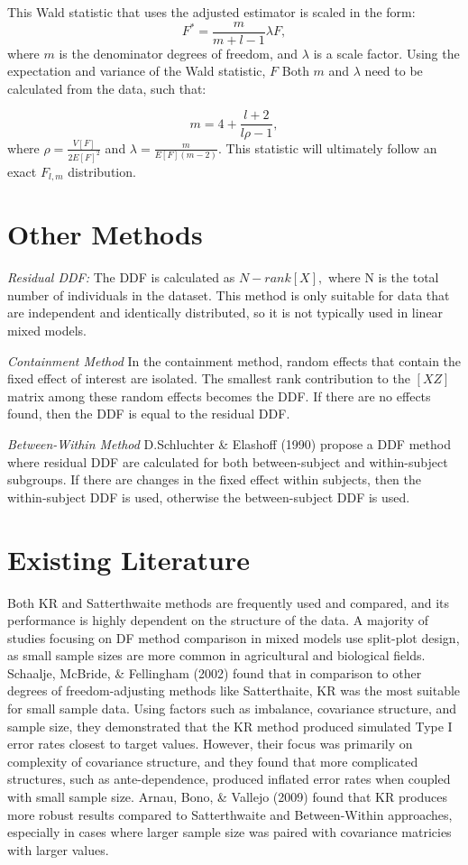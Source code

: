 \documentclass[12pt, twoside]{amherstthesis}
\begin{document}
This Wald statistic that uses the adjusted estimator is scaled in the form: \[F^* = \frac{m}{m+l-1}\lambda F,\] where \(m\) is the denominator degrees of freedom, and \(\lambda\) is a scale factor. Using the expectation and variance of the Wald statistic, \(F\) Both \(m\) and \(\lambda\) need to be calculated from the data, such that:

\[m = 4 + \frac{l+2}{l\rho-1},\] where \(\rho = \frac{V[F]}{2E[F]^2}\) and
\(\lambda = \frac{m}{E[F](m-2)}.\) This statistic will ultimately follow an exact \(F_{l,m}\) distribution.

\hypertarget{other-methods}{%
\section{Other Methods}\label{other-methods}}

\emph{Residual DDF:} The DDF is calculated as \(N-rank[X],\) where N is the total number of individuals in the dataset. This method is only suitable for data that are independent and identically distributed, so it is not typically used in linear mixed models.

\emph{Containment Method}
In the containment method, random effects that contain the fixed effect of interest are isolated. The smallest rank contribution to the \([X Z]\) matrix among these random effects becomes the DDF. If there are no effects found, then the DDF is equal to the residual DDF.

\emph{Between-Within Method}
D.Schluchter \& Elashoff (1990) propose a DDF method where residual DDF are calculated for both between-subject and within-subject subgroups. If there are changes in the fixed effect within subjects, then the within-subject DDF is used, otherwise the between-subject DDF is used.

\hypertarget{existing-literature}{%
\section{Existing Literature}\label{existing-literature}}

Both KR and Satterthwaite methods are frequently used and compared, and its performance is highly dependent on the structure of the data.
A majority of studies focusing on DF method comparison in mixed models use split-plot design, as small sample sizes are more common in agricultural and biological fields. Schaalje, McBride, \& Fellingham (2002) found that in comparison to other degrees of freedom-adjusting methods like Satterthaite, KR was the most suitable for small sample data. Using factors such as imbalance, covariance structure, and sample size, they demonstrated that the KR method produced simulated Type I error rates closest to target values. However, their focus was primarily on complexity of covariance structure, and they found that more complicated structures, such as ante-dependence, produced inflated error rates when coupled with small sample size. Arnau, Bono, \& Vallejo (2009) found that KR produces more robust results compared to Satterthwaite and Between-Within approaches, especially in cases where larger sample size was paired with covariance matricies with larger values.
\end{document}
